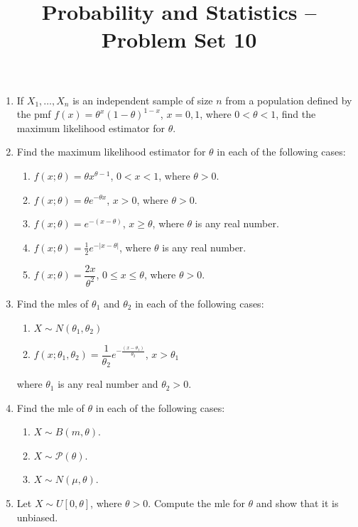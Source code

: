 \documentclass[svgnames]{amsart}
\title[]{Probability and Statistics -- Problem Set 10}
\begin{document}
\maketitle
\begin{enumerate}[leftmargin=*, itemsep=2mm]
\item If $X_1, \ldots, X_n$ is an independent sample of size $n$ from a population defined by the pmf $f(x) = \theta^x (1 - \theta)^{1 - x}$, $x = 0, 1$, where $0 < \theta < 1$, find the maximum likelihood estimator for $\theta$.

\item Find the maximum likelihood estimator for $\theta$ in each of the following cases:
\begin{enumerate}
\item $f(x; \theta) = \theta x^{\theta - 1}$, $0 < x < 1$, where $\theta > 0$.
\item $f(x; \theta) = \theta e^{-\theta x}$, $x > 0$, where $\theta > 0$.
\item $f(x; \theta) = e^{-(x - \theta)}$, $x \ge \theta$, where $\theta$ is any real number.
\item $f(x; \theta) = \frac 1 2 e^{-|x - \theta|}$, where $\theta$ is any real number.
\item $f(x; \theta) = \dfrac {2x} {\theta^2}$, $0 \le x \le \theta$, where $\theta > 0$.
\end{enumerate}

\item Find the mles of $\theta_1$ and $\theta_2$ in each of the following cases:
\begin{enumerate}
\item $X \sim N(\theta_1, \theta_2)$
\item $f(x; \theta_1, \theta_2) = \dfrac{1}{\theta_2} e^{- \frac{(x - \theta_1)}{\theta_2}}$, $x > \theta_1$
\end{enumerate}
where $\theta_1$ is any real number and $\theta_2 > 0$.

\item Find the mle of $\theta$ in each of the following cases:
\begin{enumerate}
\item  $X \sim B(m, \theta)$.
\item $X \sim \mathcal P(\theta)$.
\item $X \sim N(\mu, \theta)$.
\end{enumerate}

\item Let $X \sim U[0, \theta]$, where $\theta > 0$. Compute the mle for $\theta$ and show that it is unbiased.


\end{enumerate}
\end{document}

